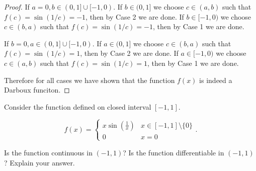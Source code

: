 \documentclass{homework}
\newcommand{\?}{\stackrel{?}{=}}
\theoremstyle{definition}
\begin{document}
\begin{proof}
    If $a = 0, b\in(0, 1]\cup[-1,0)$. If $b\in(0,1]$ we choose $c\in(a,b)$ such that $f(c)=\sin(1/c)=-1$, then by Case 2 we are done. If $b\in[-1,0)$ we choose $c\in(b,a)$ such that $f(c)=\sin(1/c)=-1$, then by Case 1 we are done.

    If $b = 0, a\in(0, 1]\cup[-1,0)$. If $a\in(0,1]$ we choose $c\in(b,a)$ such that $f(c)=\sin(1/c)=1$, then by Case 2 we are done. If $a\in[-1,0)$ we choose $c\in(a,b)$ such that $f(c)=\sin(1/c)=1$, then by Case 1 we are done. 

    Therefore for all cases we have shown that the function $f(x)$ is indeed a Darboux funciton.

\end{proof}

\question[2] Consider the function defined on closed interval $[-1,1]$.

\[f(x)=\begin{cases}
    x\sin(\frac1x) & x\in[-1,1]\setminus\{0\}\\
    0 & x=0
\end{cases}.\]

Is the function continuous in $(-1,1)$? Is the function differentiable in $(-1,1)$? Explain your answer.
\end{document}
